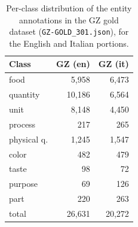 \begin{table}[t]
  \centering
  \begin{tabular}{lrr}
    \toprule
    Class & GZ (en) & GZ (it) \\
    \midrule
    food         & 5{,}958  & 6{,}473  \\
    quantity     & 10{,}186 & 6{,}564  \\
    unit         & 8{,}148  & 4{,}450  \\
    process      & 217      & 265      \\
    physical q.  & 1{,}245  & 1{,}547  \\
    color        & 482      & 479      \\
    taste        & 98       & 72       \\
    purpose      & 69       & 126      \\
    part         & 220      & 263      \\
    \midrule
    total        & 26{,}631 & 20{,}272 \\
    \bottomrule
  \end{tabular}
  \caption{Per-class distribution of the entity annotations in the GZ gold
  dataset (\texttt{GZ-GOLD\_301.json}), for the English and Italian portions.}
  \label{tab:gz-classes}
\end{table}
